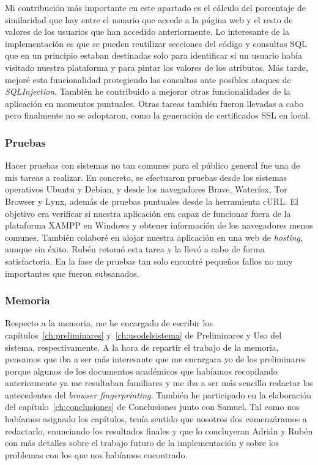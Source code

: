 Mi contribución más importante en este apartado es el cálculo del porcentaje de similaridad que hay entre el usuario que accede a la página web y el resto de valores de los usuarios que han accedido anteriormente. Lo interesante de la implementación es que se pueden reutilizar secciones del código y consultas SQL que en un principio estaban destinadas solo para identificar si un usuario había visitado nuestra plataforma y para pintar los valores de los atributos. Más tarde, mejoré esta funcionalidad protegiendo las consultas ante posibles ataques de \textit{SQLInjection}. También he contribuido a mejorar otras funcionalidades de la aplicación en momentos puntuales. Otras tareas también fueron llevadas a cabo pero finalmente no se adoptaron, como la generación de certificados SSL en local. \par 

\subsubsection{Pruebas}

Hacer pruebas con sistemas no tan comunes para el público general fue una de mis tareas a realizar. En concreto, se efectuaron pruebas desde los sistemas operativos Ubuntu y Debian, y desde los navegadores Brave, Waterfox, Tor Browser y Lynx, además de pruebas puntuales desde la herramienta cURL. El objetivo era verificar si nuestra aplicación era capaz de funcionar fuera de la plataforma XAMPP en Windows y obtener información de los navegadores menos comunes. También colaboré en alojar nuestra aplicación en una web de \textit{hosting}, aunque sin éxito. Rubén retomó esta tarea y la llevó a cabo de forma satisfactoria. En la fase de pruebas tan solo encontré pequeños fallos no muy importantes que fueron subsanados.

\subsubsection{Memoria}

Respecto a la memoria, me he encargado de escribir los capítulos~\ref{ch:preliminares} y~\ref{ch:usodelsistema} de Preliminares y Uso del sistema, respectivamente. A la hora de repartir el trabajo de la memoria, pensamos que iba a ser más interesante que me encargara yo de los preliminares porque algunos de los documentos académicos que habíamos recopilando anteriormente ya me resultaban familiares y me iba a ser más sencillo redactar los antecedentes del \textit{browser fingerprinting}. También he participado en la elaboración del capítulo~\ref{ch:conclusiones} de Conclusiones junto con Samuel. Tal como nos habíamos asignado los capítulos, tenía sentido que nosotros dos comenzáramos a redactarlo, enunciando los resultados finales y que lo concluyeran Adrián y Rubén con más detalles sobre el trabajo futuro de la implementación y sobre los problemas con los que nos habíamos encontrado. \par 


